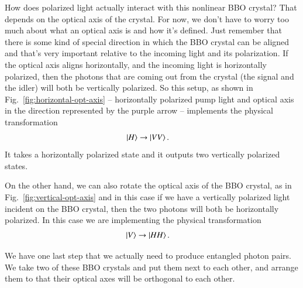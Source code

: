 How does polarized light actually interact with this nonlinear BBO crystal? That depends on the optical axis of the crystal. For now, we don't have to worry too much about what an optical axis is and how it's defined. Just remember that there is some kind of special direction in which the BBO crystal can be aligned and that's very important relative to the incoming light and its polarization. If the optical axis aligns horizontally, and the incoming light is horizontally polarized, then the photons that are coming out from the crystal (the signal and the idler) will both be vertically polarized. So this setup, as shown in Fig.~\ref{fig:horizontal-opt-axis} -- horizontally polarized pump light and optical axis in the direction represented by the purple arrow -- implements the physical transformation
\begin{equation}
\begin{aligned}
\left| H \right\rangle &\rightarrow \left| VV \right\rangle.
\end{aligned}
\end{equation}
It takes a horizontally polarized state and it outputs two vertically polarized states.

On the other hand, we can also rotate the optical axis of the BBO crystal, as in Fig.~\ref{fig:vertical-opt-axis} and in this case if we have a vertically polarized light incident on the BBO crystal, then the two photons will both be horizontally polarized.  In this case we are implementing the physical transformation
\begin{equation}
\begin{aligned}
\left| V \right\rangle &\rightarrow \left| HH \right\rangle.
\end{aligned}
\end{equation}


We have one last step that we actually need to produce entangled photon pairs.  We take two of these BBO crystals and put them next to each other, and arrange them to that their optical axes will be orthogonal to each other.

